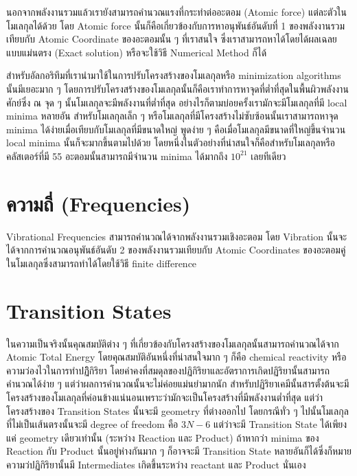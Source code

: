 นอกจากพลังงานรวมแล้วเรายังสามารถคำนวณแรงที่กระทำต่ออะตอม (Atomic force) แต่ละตัวในโมเลกุลได้ด้วย 
โดย Atomic force นั้นก็คือเกี่ยวข้องกับการหาอนุพันธ์อันดับที่ 1 ของพลังงานรวมเทียบกับ Atomic Coordinate 
ของอะตอมนั้น ๆ ที่เราสนใจ ซึ่งเราสามารถหาได้โดยได้ผลเฉลยแบบแม่นตรง (Exact solution) หรือจะใช้วิธี 
Numerical Method ก็ได้

สำหรับอัลกอริทึมที่เรานำมาใช้ในการปรับโครงสร้างของโมเลกุลหรือ minimization algorithms นั้นมีเยอะมาก ๆ 
โดยการปรับโครงสร้างของโมเลกุลนั้นก็คือเราทำการหาจุดที่ต่ำที่สุดในพื้นผิวพลังงานศักย์ซึ่ง 
ณ จุด ๆ นั้นโมเลกุลจะมีพลังงานที่ต่ำที่สุด อย่างไรก็ตามบ่อยครั้งเรามักจะมีโมเลกุลที่มี local minima หลายอัน 
สำหรับโมเลกุลเล็ก ๆ หรือโมเลกุลที่มีโครงสร้างไม่ซับซ้อนนั้นเราสามารถหาจุด minima 
ได้ง่ายเมื่อเทียบกับโมเลกุลที่มีขนาดใหญ่ พูดง่าย ๆ คือเมื่อโมเลกุลมีขนาดที่ใหญ่ขึ้นจำนวน local minima 
นั้นก็จะมากขึ้นตามไปด้วย โดยหนึ่งในตัวอย่างที่น่าสนใจก็คือสำหรับโมเลกุลหรือคลัสเตอร์ที่มี 55 อะตอมนั้นสามารถมีจำนวน 
minima ได้มากถึง $10^{21}$ เลยทีเดียว

\section{ความถี่ (Frequencies)}

Vibrational Frequencies สามารถคำนวณได้จากพลังงานรวมเชิงอะตอม โดย Vibration 
นั้นจะได้จากการคำนวณอนุพันธ์อันดับ 2 ของพลังงานรวมเทียบกับ Atomic Coordinates 
ของอะตอมคู่ในโมเลกุลซึ่งสามารถทำได้โดยใช้วิธี finite difference 

\section{Transition States}

ในความเป็นจริงนั้นคุณสมบัติต่าง ๆ ที่เกี่ยวข้องกับโครงสร้างของโมเลกุลนั้นสามารถคำนวณได้จาก Atomic Total Energy 
โดยคุณสมบัติอันหนึ่งที่น่าสนใจมาก ๆ ก็คือ chemical reactivity หรือความว่องไวในการทำปฏิิกิริยา 
โดยค่าคงที่สมดุลของปฏิกิริยาและอัตราการเกิดปฏิริยานั้นสามารถคำนวณได้ง่าย ๆ แต่ว่าผลการคำนวณนั้นจะไม่ค่อยแม่นยำมากนัก 
สำหรับปฏิริยาเคมีนั้นสารตั้งต้นจะมีโครงสร้างของโมเลกุลที่ค่อนข้างแน่นอนเพราะว่ามักจะเป็นโครงสร้างที่มีพลังงานต่ำที่สุด 
แต่ว่าโครงสร้างของ Transition States นั้นจะมี geometry ที่ต่างออกไป โดยกรณีทั่ว ๆ ไปนั้นโมเลกุลที่ไม่เป็นเส้นตรงนั้นจะมี 
degree of freedom คือ $3N - 6$ แต่ว่าจะมี Transition State ได้เพียงแค่ geometry เดียวเท่านั้น 
(ระหว่าง Reaction และ Product) ถ้าหากว่า minima ของ Reaction กับ Product นั้นอยู่ห่างกันมาก ๆ 
ก็อาจจะมี Transition State หลายอันก็ได้ซึ่งก็หมายความว่ปฏิกิริยานั้นมี Intermediates เกิดขึ้นระหว่าง 
reactant และ Product นั่นเอง 

